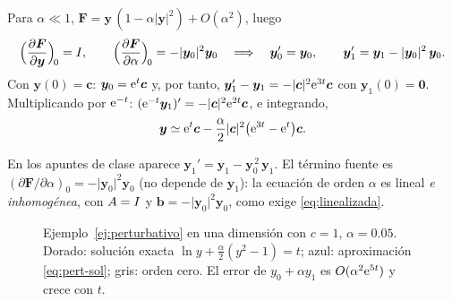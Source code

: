 \documentclass[11pt,twoside]{article}
\newcommand\vy{\bm{y}}
\newcommand\vb{\bm{b}}
\newcommand\vc{\bm{c}}
\newcommand\vF{\bm{F}}
\newcommand\abs[1]{\lvert#1\rvert}
\begin{document}
\begin{ejemplo}[$\vy\,'=\vy/(1+\alpha\abs{\vy}^2)$]\label{ej:perturbativo}
Para $\alpha\ll1$, $\vF=\vy\,(1-\alpha\abs{\vy}^2)+O(\alpha^2)$, luego
\begin{equation*}
\Big(\pd{\vF}{\vy}\Big)_{\!0}=\Id,\qquad \Big(\pd{\vF}{\alpha}\Big)_{\!0}=-\abs{\vy_0}^2\vy_0
\quad\Longrightarrow\quad
\vy_0'=\vy_0,\qquad \vy_1'=\vy_1-\abs{\vy_0}^2\,\vy_0 .
\end{equation*}
Con $\vy(0)=\vc$: $\vy_0=\e^{t}\vc$ y, por tanto, $\vy_1'-\vy_1=-\abs{\vc}^2\e^{3t}\vc$ con $\vy_1(0)=\bm 0$.
Multiplicando por $\mathrm{e}^{-t}$: $(\e^{-t}\vy_1)'=-\abs{\vc}^2\e^{2t}\vc$, e integrando,
\begin{equation}\label{eq:pert-sol}
\vy\simeq\e^{t}\vc-\frac{\alpha}{2}\abs{\vc}^2\big(\e^{3t}-\e^{t}\big)\vc .
\end{equation}
\end{ejemplo}

\begin{observacion}
En los apuntes de clase aparece $\vy_1'=\vy_1-\vy_0^{\,2}\,\vy_1$. El término fuente es
$(\partial\vF/\partial\alpha)_0=-\abs{\vy_0}^2\vy_0$ (no depende de $\vy_1$): la ecuación de orden $\alpha$ es lineal
\emph{e inhomogénea}, con $A=I$ y $\vb=-\abs{\vy_0}^2\vy_0$, como exige \eqref{eq:linealizada}.
\end{observacion}

\begin{figure}[!htbp]
\centering
{}
\caption{Ejemplo~\ref{ej:perturbativo} en una dimensión con $c=1$, $\alpha=0.05$. Dorado: solución exacta
$\ln y+\frac{\alpha}{2}(y^2-1)=t$; azul: aproximación \eqref{eq:pert-sol}; gris: orden cero. El error de $y_0+\alpha y_1$
es $O(\alpha^2\mathrm{e}^{5t})$ y crece con $t$.}
\label{fig:perturbativo}
\end{figure}
\end{document}

